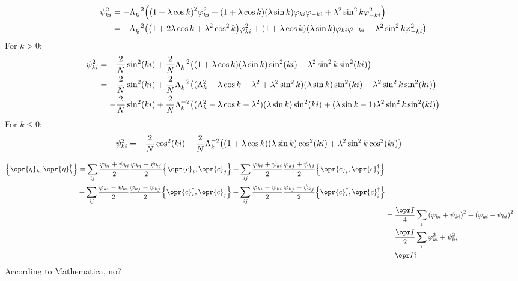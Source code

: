 \documentclass[../thesis.tex]{subfiles}
\begin{document}
\begin{align}
  \psi_{ki}^2
  &= -\Lambda_k^{-2} \qty(%
  {(1 + \lambda\cos k)}^2\varphi_{ki}^2
  + (1 + \lambda\cos k)(\lambda\sin k)\varphi_{ki}\varphi_{-ki}
  + \lambda^2\sin^2 k\varphi_{-ki}^2
  ) \\
  &= -\Lambda_k^{-2} \qty(%
  \qty(1 + 2\lambda\cos k + \lambda^2\cos^2 k)\varphi_{ki}^2
  + (1 + \lambda\cos k)(\lambda\sin k)\varphi_{ki}\varphi_{-ki}
  + \lambda^2\sin^2 k\varphi_{-ki}^2
  )
\end{align}
For $k > 0$:
\begin{align}
  \psi_{ki}^2
  &= -\frac{2}{N}\sin^2(ki)
  + \frac{2}{N}\Lambda_k^{-2}\qty(
  (1 + \lambda\cos k)(\lambda\sin k)\sin^2(ki)
  - \lambda^2\sin^2 k\sin^2(ki)
  ) \\
  &= -\frac{2}{N}\sin^2(ki)
  + \frac{2}{N}\Lambda_k^{-2}\qty(
  (\Lambda_k^2 - \lambda\cos k - \lambda^2 + \lambda^2\sin^2 k)(\lambda\sin k)\sin^2(ki)
  - \lambda^2\sin^2 k\sin^2(ki)
  ) \\
  &= -\frac{2}{N}\sin^2(ki)
  + \frac{2}{N}\Lambda_k^{-2}\qty(
  (\Lambda_k^2 - \lambda\cos k - \lambda^2)(\lambda\sin k)\sin^2(ki)
  + (\lambda\sin k - 1)\lambda^2\sin^2 k\sin^2(ki)
  ) \\
\end{align}
For $k \leq 0$:
\begin{align}
  \psi_{ki}^2
  &= -\frac{2}{N}\cos^2(ki)
  - \frac{2}{N}\Lambda_k^{-2}\qty(
  (1 + \lambda\cos k)(\lambda\sin k)\cos^2(ki)
  + \lambda^2\sin^2 k\cos^2(ki)
  )
\end{align}

\begin{align}
  \begin{split}
    \acomm{\opr{\eta}_k}{\opr{\eta}_k^\dag}
  &=
  \sum_{ij}
  \frac{\varphi_{ki} + \psi_{ki}}{2}
  \frac{\varphi_{kj} - \psi_{kj}}{2}
  \acomm{\opr{c}_i}{\opr{c}_j}
  +
  \sum_{ij}
  \frac{\varphi_{ki} + \psi_{ki}}{2}
  \frac{\varphi_{kj} + \psi_{kj}}{2}
  \acomm{\opr{c}_i}{\opr{c}_j^\dag} \\
  &+
  \sum_{ij}
  \frac{\varphi_{ki} - \psi_{ki}}{2}
  \frac{\varphi_{kj} - \psi_{kj}}{2}
  \acomm{\opr{c}_i^\dag}{\opr{c}_j}
  +
  \sum_{ij}
  \frac{\varphi_{ki} - \psi_{ki}}{2}
  \frac{\varphi_{kj} + \psi_{kj}}{2}
  \acomm{\opr{c}_i^\dag}{\opr{c}_j^\dag}
  \end{split} \\
  &= \frac{\idopr}{4} \sum_{i}
  {\qty(\varphi_{ki} + \psi_{ki})}^2
  + {\qty(\varphi_{ki} - \psi_{ki})}^2
  \\
  &= \frac{\idopr}{2} \sum_{i}
  \varphi_{ki}^2 + \psi_{ki}^2
  \\
  &= \idopr?
\end{align}
According to Mathematica, no?
\end{document}
